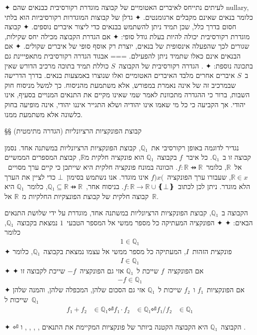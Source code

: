 ✦ לעיתים נתייחס לאיברים האטומיים של קבוצה מוגדרת רקורסיבית כבנאים שהם nullary,
כלומר בנאים שאינם מקבלים ארגומנטים.
✦ גדלן של קבוצות המוגדרות רקורסיביות הוא בלתי חסום בדרך כלל, שכן תמיד ניתן
להשתמש בבנאים כדי ליצור איברים נוספים.
✦ קבוצה מוגדרת רקורסיבית יכולה להיות בעלת גודל סופי:
✦ אם הגדרת הקבוצה מכילה יחס שקילות, שגורים לכך שהפעלה אינסופית של בנאים, יוצרת
רק אוסף סופי של איברים שקולים.
✦ אם הבנאים אינם כאלו שתמיד ניתן להפעילם.
===
{אבגוד}
הגדרה רקורסיבית מתאפייינת גם בתכונה נוספת:
✦ . הגדרה רקורסיבית של הקבוצה~$S$ כוללת תמיד בתוכה מרכיב
הדורש שאין ב~$S$ איברים אחרים מלבד האיברים האטומיים ואלו שנוצרו באמצעות בנאים.
בדרך הדרישה שבמרכיב זה של אינה נאמרת במפורש, אלא משתמעת מהניסוח. כך למשל מניסוח
חוק השבות, ברור כי ההגדרה מתכוונת לאמר שמי שאינו מקיים את התנאים המנויים בסעיף,
אינו יהודי. אך הקביעה כי כל מי שאמו אינו יהודיה ושלא התגייר איננו יהודי, אינה
מופיעה בחוק כלשונה אלא משתמעת ממנו.

§§ קבוצת הפונקציות הרציונליות (הגדרה מתימטית)

נגדיר לדוגמה באופן רקורסיבי את~$ℚ₁$, קבוצת הפונקציות הרציונליות במשתנה אחד.
נסמן קבוצה זו ב~$ℚ₁$. כל איבר~$f$ בקבוצה~$ℚ₁$ הוא פונקציה חלקית מ$ℝ$, קבוצת
המספרים הממשיים אל~$ℝ$, כלומר~$f:ℝ⇸ℝ$. הכוונה במונח פונקציה חלקית היא שייתכן כי
קיים ערך מסויים~$ℝ∈x$, שעבורו ערך הפונקציה~$f)x($ אינו מוגדר. אנו נשתמש
בסימון~$⊥$ כדי לציין את הערך הלא מוגדר. ניתן לכן לכתוב~$f:ℝ→ℝ∪❴⊥❵$. בניסוח
אחר,~$ℚ₁⊆ℝ⇸ℝ$, כלומר~$ℚ₁$ היא קבוצה חלקית של קבוצת הפונצקיות החלקיות מ~$ℝ$
אל~$ℝ$.

\begin{Definition}
  \label{definition:rationals}
  הקבוצה ב~$ℚ₁$, קבוצת הפונקציות הרציונליות במשתנה אחד, מוגדרת על ידי שלושת התנאים הבאים:
  ✦ 
  ✦ הפונקציה המעתיקה כל מספר ממשי אל המספר הטבעי~$1$ נמצאת בקבוצה~$ℚ₁$, כלומר
  \begin{align}\label{eq:1}
    1∈ℚ₁
  \end{align}
  ✦ פונקצית הזהות~$I$, המעתיקה כל מספר ממשי אל עצמו נמצאת בקבוצה~$ℚ₁$, כלומר
  \begin{align}\label{eq:x}
    I∈ℚ₁
  \end{align}
  ✦ 
  ✦ אם הפונקציה~$f$ שייכת ל~$ℚ₁$ אזי גם הפונקציה~$-f$ שייכת לקבוצה זו
  \begin{align}\label{eq:minus}
    -f∈ℚ₁
  \end{align}
  ✦ אם הפונקציות~$f₁$ ו~$f₂$ שייכות ל~$ℚ₁$ אזי גם הסכום שלהן, המכפלה
  שלהן, והמנה שלהן שייכות ל~$ℚ₁$
  \begin{align}
    f₁+f₂ &∈ℚ₁ \label{eq:plus} ⏎
    f₁·f₂ &∈ℚ₁ \label{eq:times} ⏎
    f₁/f₂ &∈ℚ₁ \label{eq:div}
  \end{align}

  ✦ 
 ⏎ הקבוצה~$ℚ₁$ היא הקבוצה הקטנה ביותר של פונקציות המקיימת את התנאים
  ,
  ,
  ,
  ,
  ו
  .
\end{Definition}

